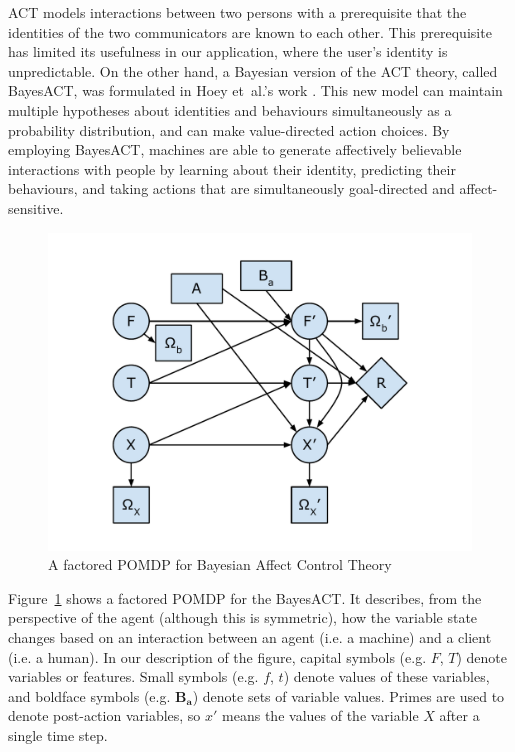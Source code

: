 ACT models interactions between two persons with a prerequisite that the identities of the two communicators are known to each other. This prerequisite has limited its usefulness in our application, where the user's identity is unpredictable. On the other hand, a Bayesian version of the ACT theory, called BayesACT, was formulated in Hoey et~al.'s work \cite{hoey2013bayesian}. This new model can maintain multiple hypotheses about identities and behaviours simultaneously as a probability distribution, and can make value-directed action choices. By employing BayesACT, machines are able to generate affectively believable interactions with people by learning about their identity, predicting their behaviours, and taking actions that are simultaneously goal-directed and affect-sensitive.

\begin{figure}[htb]
\centering
\includegraphics[trim = 10mm 10mm 10mm 10mm, clip, width=0.7\linewidth]{fig/fig-bayesact.pdf}
\caption{A factored POMDP for Bayesian Affect Control Theory}
\label{fig:bayesact}
\end{figure}

Figure~\ref{fig:bayesact} shows a factored POMDP for the BayesACT. It describes, from the perspective of the agent (although this is symmetric), how the variable state changes based on an interaction between an agent (i.e. a machine) and a client (i.e. a human). In our description of the figure, capital symbols (e.g. $F$, $T$) denote variables or features. Small symbols (e.g. $f$, $t$) denote values of these variables, and boldface symbols (e.g. $\mathbf{B_{a}}$) denote sets of variable values. Primes are used to denote post-action variables, so $x'$ means the values of the variable $X$ after a single time step.

